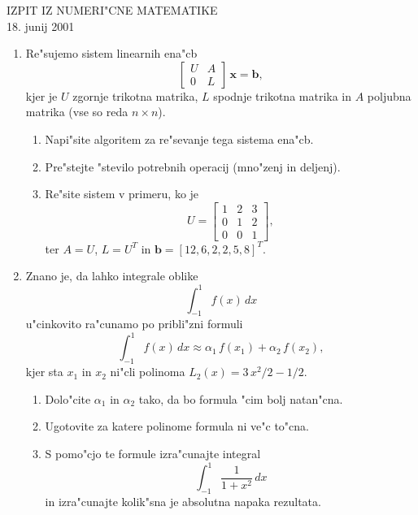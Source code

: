 
\begin{center}
  IZPIT IZ NUMERI"CNE MATEMATIKE\\
  18. junij 2001
\end{center}

\begin{enumerate}

  \item Re"sujemo sistem linearnih ena"cb
    $$\left[
    \begin{array}{cc}
      U & A\\
      0 & L
    \end{array}
    \right]\,\mathbf{x}=\mathbf{b},$$
    kjer je $U$ zgornje trikotna matrika, $L$ spodnje trikotna matrika in
    $A$ poljubna matrika (vse so reda $n\times n$).


  \begin{enumerate}
   
     \item Napi"site algoritem za re"sevanje tega sistema ena"cb.
       

     \item Pre"stejte "stevilo potrebnih operacij (mno"zenj in deljenj).
       
       

     \item Re"site sistem v primeru, ko je
         $$U=
         \left[
         \begin{array}{ccc}
            1 & 2 & 3\\
            0 & 1 & 2\\
            0 & 0 & 1
         \end{array}
         \right],
         $$
         ter $A=U$, $L=U^T$ in $\mathbf{b}=[12,6,2,2,5,8]^T$.       
       
  \end{enumerate}

  \item Znano je, da lahko integrale oblike
    $$\int_{-1}^{1}f(x)\,dx$$
    u"cinkovito ra"cunamo po pribli"zni formuli
    $$\int_{-1}^{1}f(x)\,dx\approx \alpha_1\,f(x_1)+\alpha_2\,f(x_2),$$
    kjer sta $x_1$ in $x_2$ ni"cli polinoma $L_2(x)=3\,x^2/2-1/2$.
    

  \begin{enumerate}
    
    \item Dolo"cite $\alpha_1$ in $\alpha_2$ tako, da bo formula "cim bolj
          natan"cna.

    \item Ugotovite za katere polinome formula ni ve"c to"cna.
      
    \item S pomo"cjo te formule izra"cunajte integral
          $$\int_{-1}^{1}\frac{1}{1+x^2}\,dx$$
          in izra"cunajte kolik"sna je absolutna napaka rezultata.
      
          

  \end{enumerate} 
\end{enumerate}



         
